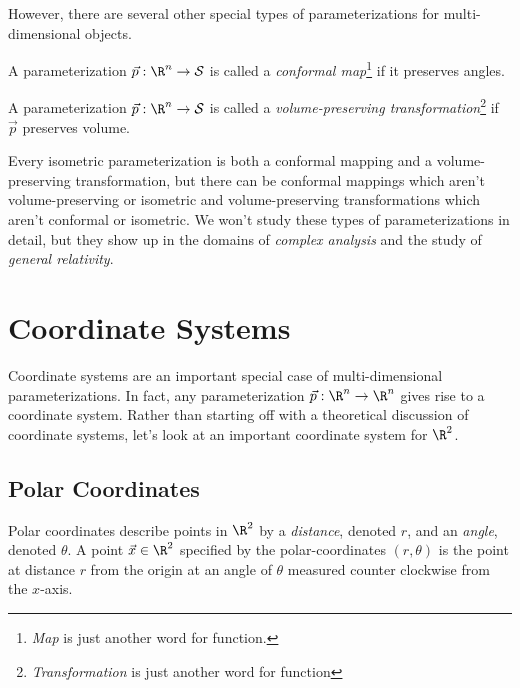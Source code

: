 However, there are several other special types of parameterizations for multi-dimensional objects.

\begin{definition}
	A parameterization $\vec p:\R^n\to\mathcal S$ is called a \emph{conformal map}\footnote{ \emph{Map}
	is just another word for function.}
	if it preserves angles.
\end{definition}

\begin{definition}
	A parameterization $\vec p:\R^n\to\mathcal S$ is called a \emph{volume-preserving transformation}\footnote{ 
	\emph{Transformation} is just another word for function} if $\vec p$ preserves volume.
\end{definition}

Every isometric parameterization is both a conformal mapping and a volume-preserving transformation, but
there can be conformal mappings which aren't volume-preserving or isometric and volume-preserving transformations
which aren't conformal or isometric.  We won't study these types of parameterizations in detail, but
they show up in the domains of \emph{complex analysis} and the study of \emph{general relativity}.


\begin{exercises}
\end{exercises}

\section{Coordinate Systems}

Coordinate systems are an important special case of multi-dimensional parameterizations.
In fact, any parameterization $\vec p:\R^n\to\R^n$ gives rise to a coordinate system.  Rather than
starting off with a theoretical discussion of coordinate systems,
let's look at an
important coordinate system for $\R^2$.

\subsection{Polar Coordinates}
Polar coordinates describe points in $\R^2$ by a \emph{distance}, denoted $r$,
and an \emph{angle}, denoted $\theta$.  A point $\vec x\in\R^2$ specified by the polar-coordinates
$(r,\theta)$ is the point at distance $r$ from the origin at an angle of $\theta$
measured counter clockwise from the $x$-axis.

